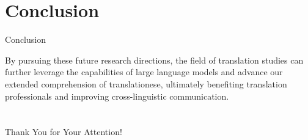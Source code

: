 \documentclass[
]{beamer}
\begin{document}
\section[Conclusion]{Conclusion}

\begin{frame}{Conclusion}

\hspace{0.4cm} By pursuing these future research directions, the field of translation studies can further leverage the capabilities of large language models and advance our  extended comprehension of translationese, ultimately benefiting translation professionals and improving cross-linguistic communication.

\end{frame}

\nocite{*}
\section{\bibname}
\begin{frame}[t, allowframebreaks]{\bibname}
\printbibliography[heading=none]
\end{frame}


\begin{frame}%
\vfill
\centerline{Thank You for Your Attention!}
\vfill\vfill
\end{frame}
%
\end{document}

